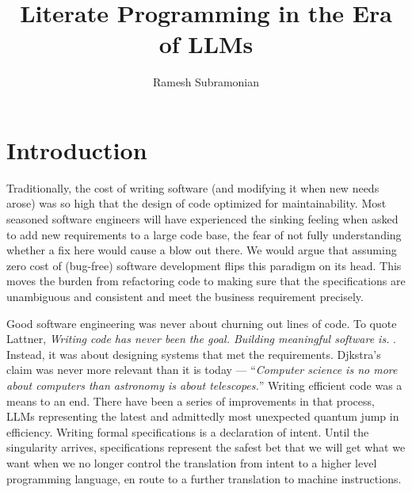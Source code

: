 \documentclass[letterpaper,12pt]{article}
\begin{document}
\title{Literate Programming in the Era of LLMs}
\author{Ramesh Subramonian }
\maketitle
\thispagestyle{fancy}
\lhead{}
\chead{}
\rhead{}
\lfoot{}
\cfoot{}
\rfoot{{\small \thepage}}




\section{Introduction}
\label{intro}

Traditionally, the cost of writing software 
(and modifying it when new needs arose) was so high that the design of 
code optimized for maintainability. Most seasoned software engineers will have
experienced the sinking feeling when asked to add new requirements to a large
code base, the fear of not fully understanding whether a fix here 
would cause a blow out there. We would argue that assuming 
zero cost of (bug-free) software development flips this paradigm on 
its head. This moves the burden from refactoring code to making sure that the specifications are
unambiguous and consistent and meet the business requirement precisely.

Good software engineering was never about churning out lines of code. 
To quote Lattner, {\em Writing code has never been the goal. Building meaningful
software is.} \cite{CCC_Lattner_2026}.
Instead, it was about designing systems that met the requirements.
Djkstra's claim was never more relevant than it is today --- 
``{\em Computer science is no more about computers than astronomy is about
telescopes.}'' Writing efficient code was a means to an end.
There have been a series of improvements in that process, 
LLMs representing the
latest and admittedly most unexpected quantum jump in efficiency.
Writing formal specifications is a declaration of intent. 
Until the singularity arrives, specifications represent the safest 
bet that we will get what we want when we no longer control the 
translation from intent to a higher level programming language,
en route to a further translation to machine instructions.
\end{document}
